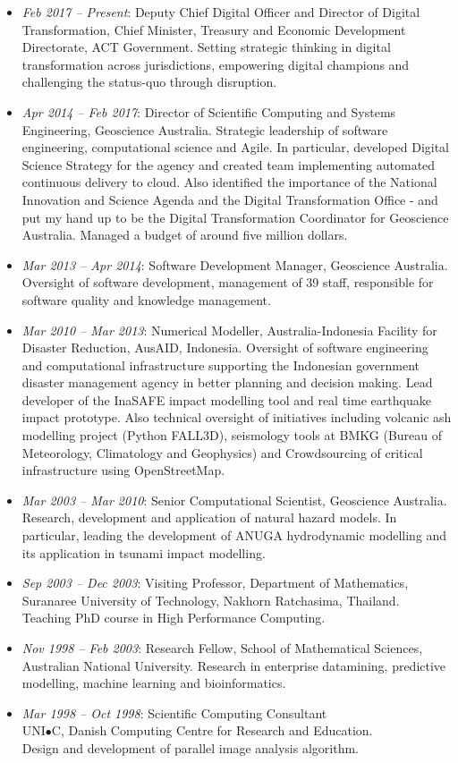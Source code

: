 \documentclass[11pt,a4paper]{article}
\begin{document}
\begin{itemize}
\item {\em Feb 2017 -- Present}: Deputy Chief Digital Officer and Director of Digital Transformation, Chief Minister, Treasury and Economic Development Directorate, ACT Government.
      Setting strategic thinking in digital transformation across jurisdictions, empowering digital champions and challenging the status-quo through disruption.        
\item {\em Apr 2014 -- Feb 2017}: Director of Scientific Computing and Systems Engineering, Geoscience Australia.
      Strategic leadership of software engineering, computational science and Agile.
      In particular, developed Digital Science Strategy for the agency and created team implementing automated continuous delivery to cloud.
      Also identified the importance of the National Innovation and Science Agenda and the Digital Transformation Office - and put my hand up to be the Digital Transformation Coordinator for Geoscience Australia. Managed a budget of around five million dollars.
\item {\em Mar 2013 -- Apr 2014}: Software Development Manager, Geoscience Australia.
      Oversight of software development, management of 39 staff, responsible for software quality and knowledge management.
\item {\em Mar 2010 -- Mar 2013}: Numerical Modeller, Australia-Indonesia Facility for Disaster Reduction, AusAID, Indonesia.
      Oversight of software engineering and computational infrastructure supporting the Indonesian government disaster management agency in better planning and decision making. Lead developer of the InaSAFE impact modelling tool and real time earthquake impact prototype. Also technical oversight of initiatives including volcanic ash modelling project (Python FALL3D), seismology tools at BMKG (Bureau of Meteorology, Climatology and Geophysics) and Crowdsourcing of critical infrastructure using OpenStreetMap.
\item {\em Mar 2003 -- Mar 2010}: Senior Computational Scientist, Geoscience Australia.
      Research, development and application of natural hazard models. In particular, leading the development of ANUGA hydrodynamic modelling and its application in tsunami impact modelling.
\item {\em Sep 2003 -- Dec 2003}: Visiting Professor,
      Department of Mathematics,
      Suranaree University of Technology, Nakhorn Ratchasima, Thailand. Teaching PhD course in
      High Performance Computing.
\item {\em Nov 1998 -- Feb 2003}: Research Fellow,
      School of Mathematical Sciences, Australian National University.
      Research in enterprise datamining, predictive modelling, machine learning and bioinformatics.
\item {\em Mar 1998 -- Oct 1998}: Scientific Computing Consultant \\
      UNI$\bullet$C, Danish Computing Centre for Research and Education.\\
      Design and development of parallel image analysis algorithm.
\end{itemize}
\end{document}
